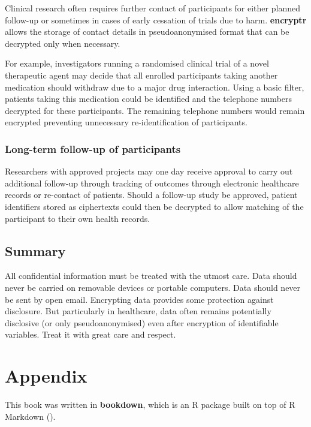 \documentclass[
  12pt,
  krantz2]{krantz}
\begin{document}
Clinical research often requires further contact of participants for either planned follow-up or sometimes in cases of early cessation of trials due to harm.
\textbf{encryptr} allows the storage of contact details in pseudoanonymised format that can be decrypted only when necessary.

For example, investigators running a randomised clinical trial of a novel therapeutic agent may decide that all enrolled participants taking another medication should withdraw due to a major drug interaction.
Using a basic filter, patients taking this medication could be identified and the telephone numbers decrypted for these participants.
The remaining telephone numbers would remain encrypted preventing unnecessary re-identification of participants.

\hypertarget{long-term-follow-up-of-participants}{%
\subsection{Long-term follow-up of participants}\label{long-term-follow-up-of-participants}}

Researchers with approved projects may one day receive approval to carry out additional follow-up through tracking of outcomes through electronic healthcare records or re-contact of patients.
Should a follow-up study be approved, patient identifiers stored as ciphertexts could then be decrypted to allow matching of the participant to their own health records.

\hypertarget{summary-6}{%
\section{Summary}\label{summary-6}}

All confidential information must be treated with the utmost care.
Data should never be carried on removable devices or portable computers.
Data should never be sent by open email.
Encrypting data provides some protection against disclosure.
But particularly in healthcare, data often remains potentially disclosive (or only pseudoanonymised) even after encryption of identifiable variables.
Treat it with great care and respect.

\hypertarget{appendix}{%
\chapter*{Appendix}\label{appendix}}


This book was written in \textbf{bookdown}, which is an R package built on top of R Markdown (\citet{xie2016}).
\end{document}
